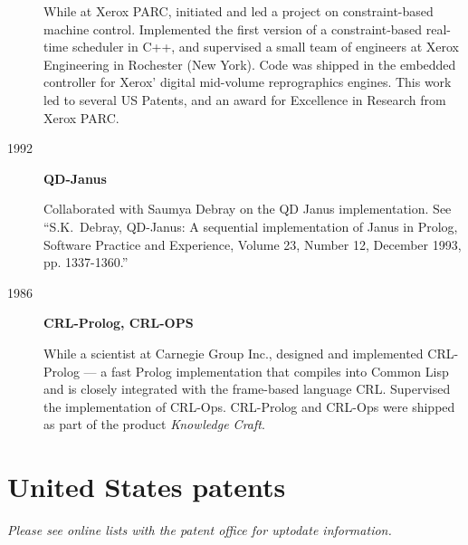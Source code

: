 \documentclass{article}
\begin{document}
\begin{description}
While at Xerox PARC, initiated and led a project on constraint-based
  machine control.  Implemented the first version of a
  constraint-based real-time scheduler in C++, and supervised a small
  team of engineers at Xerox Engineering in Rochester (New York).
  Code was shipped in the embedded controller for Xerox' digital
  mid-volume reprographics engines.  This work led to several US
  Patents, and an award for Excellence in Research from Xerox PARC.

\item[1992]\textbf{QD-Janus}

Collaborated with Saumya Debray on the QD Janus implementation. See
  ``S.K.~Debray, QD-Janus: A sequential implementation of Janus in
  Prolog, Software Practice and Experience, Volume 23, Number 12,
  December 1993, pp. 1337-1360.''


\item[1986]\textbf{CRL-Prolog, CRL-OPS}

While a scientist at Carnegie Group Inc., designed and implemented
  CRL-Prolog --- a fast Prolog implementation that compiles into
  Common Lisp and is closely integrated with the frame-based language
  CRL.  Supervised the implementation of CRL-Ops.  CRL-Prolog
  and CRL-Ops were shipped as part of the product \textit{Knowledge
  Craft}.


\end{description}

\section*{United States patents}
{\em Please see online lists with the patent office for uptodate information.}
\end{document}
